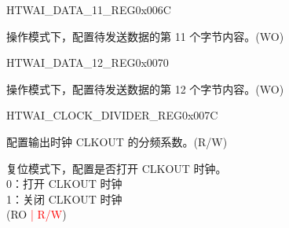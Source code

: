 \begin{register}{H}{TWAI\_DATA\_11\_REG}{0x006C}\label{regdesc:TWAIDATA11REG}
%
%
\regnewline%
\begin{regdesc}\begin{reglist}
\label{fielddesc:TWAITXBYTE11}\item [TWAI\_TX\_BYTE\_11] 操作模式下，配置待发送数据的第 11 个字节内容。(WO)
\end{reglist}\end{regdesc}
\end{register}


\begin{register}{H}{TWAI\_DATA\_12\_REG}{0x0070}\label{regdesc:TWAIDATA12REG}
%
%
\regnewline%
\begin{regdesc}\begin{reglist}
\label{fielddesc:TWAITXBYTE12}\item [TWAI\_TX\_BYTE\_12] 操作模式下，配置待发送数据的第 12 个字节内容。(WO)
\end{reglist}\end{regdesc}
\end{register}


\begin{register}{H}{TWAI\_CLOCK\_DIVIDER\_REG}{0x007C}\label{regdesc:TWAICLOCKDIVIDERREG}
%
%
%
\regnewline%
\begin{regdesc}\begin{reglist}
\label{fielddesc:TWAICD}\item [TWAI\_CD] 配置输出时钟 CLKOUT 的分频系数。(R/W)
\label{fielddesc:TWAICLOCKOFF}\item [TWAI\_CLOCK\_OFF] 复位模式下，配置是否打开 CLKOUT 时钟。\\
0：打开 CLKOUT 时钟\\
1：关闭 CLKOUT 时钟 \\
(RO \textcolor{red}{| R/W})
\end{reglist}\end{regdesc}
\end{register}


